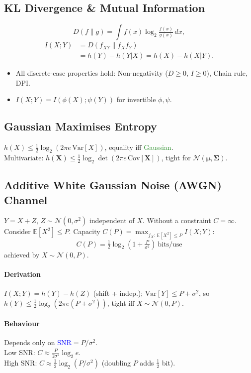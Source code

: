 \subsection{KL Divergence \& Mutual Information}
\[D(f\|g)=\int f(x)\log_2\tfrac{f(x)}{g(x)}\,dx,\]
\begin{align*}
  I(X;Y) &= D(f_{XY}\|f_X f_Y)\\
         &= h(Y)-h(Y|X)=h(X)-h(X|Y).
\end{align*}
\begin{itemize}
  \item All discrete-case properties hold: \textcolor{Bittersweet}{Non-negativity} ($D\ge 0$, $I\ge 0$), \textcolor{Bittersweet}{Chain rule}, \textcolor{Bittersweet}{DPI}.
  \item $I(X;Y)=I(\phi(X);\psi(Y))$ for invertible $\phi,\psi$.
\end{itemize}

\subsection{Gaussian Maximises Entropy}
$h(X)\le\tfrac12\log_2(2\pi e\,\mathrm{Var}[X])$, equality iff \textcolor{ForestGreen}{Gaussian}.\\
\textcolor{Bittersweet}{Multivariate}: $h(\mathbf X)\le\tfrac12\log_2\det(2\pi e\,\mathrm{Cov}[\mathbf X])$, tight for $\mathcal N(\boldsymbol\mu,\boldsymbol\Sigma)$.

\subsection{Additive White Gaussian Noise (AWGN) Channel}
$Y=X+Z$, $Z\sim\mathcal N(0,\sigma^2)$ independent of $X$. Without a constraint $C=\infty$. Consider $\mathbb E[X^2]\le P$. Capacity $C(P)=\max_{f_X:\,\mathbb E[X^2]\le P}I(X;Y)$:
\[\boxed{\ C(P)=\tfrac12\log_2\!\left(1+\tfrac{P}{\sigma^2}\right)\ \text{bits/use}\ }\]
achieved by $X\sim\mathcal N(0,P)$.
\paragraph{Derivation} $I(X;Y)=h(Y)-h(Z)$ (shift + indep.); $\mathrm{Var}[Y]\le P+\sigma^2$, so $h(Y)\le\tfrac12\log_2(2\pi e(P+\sigma^2))$, tight iff $X\sim\mathcal N(0,P)$.
\paragraph{Behaviour} Depends only on \textcolor{Blue}{SNR}$=P/\sigma^2$.\\
\textcolor{Bittersweet}{Low SNR}: $C\approx\tfrac{P}{2\sigma^2}\log_2 e$.\\
\textcolor{Bittersweet}{High SNR}: $C\approx\tfrac12\log_2(P/\sigma^2)$ (doubling $P$ adds $\tfrac12$ bit).

